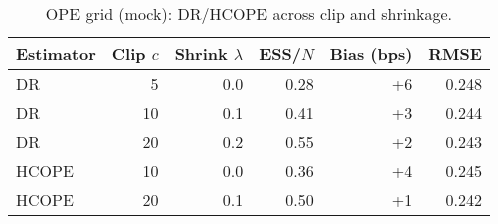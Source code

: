 \begin{table}[t]
  \centering
  \small
  \caption{OPE grid (mock): DR/HCOPE across clip and shrinkage.}
  \begin{tabular}{lrrrrr}
    \toprule
    Estimator & Clip $c$ & Shrink $\lambda$ & ESS/\(N\) & Bias (bps) & RMSE \\
    \midrule
    DR       & 5   & 0.0  & 0.28 & +6  & 0.248 \\
    DR       & 10  & 0.1  & 0.41 & +3  & 0.244 \\
    DR       & 20  & 0.2  & 0.55 & +2  & 0.243 \\
    HCOPE    & 10  & 0.0  & 0.36 & +4  & 0.245 \\
    HCOPE    & 20  & 0.1  & 0.50 & +1  & 0.242 \\
    \bottomrule
  \end{tabular}
\end{table}
